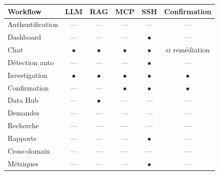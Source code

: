 \begin{longtable}{@{}p{3.6cm}ccccc@{}}
\toprule
\textbf{Workflow} & \textbf{LLM} & \textbf{RAG} & \textbf{MCP} & \textbf{SSH} & \textbf{Confirmation}\\
\midrule
\endhead
Authentification & --- & --- & --- & --- & ---\\
Dashboard & --- & --- & --- & \(\bullet\) & ---\\
Chat & \(\bullet\) & \(\bullet\) & \(\bullet\) & \(\bullet\) & si remédiation\\
Détection auto & --- & --- & --- & \(\bullet\) & ---\\
Investigation & \(\bullet\) & \(\bullet\) & \(\bullet\) & \(\bullet\) & \(\bullet\)\\
Confirmation & --- & --- & \(\bullet\) & \(\bullet\) & \(\bullet\)\\
Data Hub & --- & \(\bullet\) & --- & --- & ---\\
Demandes & --- & --- & --- & --- & ---\\
Recherche & --- & --- & --- & --- & ---\\
Rapports & --- & --- & --- & \(\bullet\) & ---\\
Cross-domain & --- & --- & --- & --- & ---\\
Métriques & --- & --- & --- & \(\bullet\) & ---\\
\bottomrule
\end{longtable}

